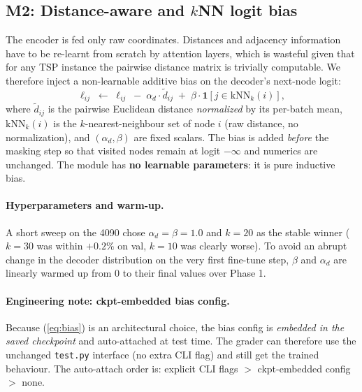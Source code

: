 \documentclass[11pt,a4paper]{article}
\begin{document}
\subsection{M2: Distance-aware and $k$NN logit bias}
\label{sec:m2}

The encoder is fed only raw coordinates. Distances and adjacency information
have to be re-learnt from scratch by attention layers, which is wasteful given
that for any TSP instance the pairwise distance matrix is trivially
computable. We therefore inject a non-learnable additive bias on the
decoder's next-node logit:
%
\begin{equation}
   \ell_{ij} \;\leftarrow\; \ell_{ij}
   \;-\; \alpha_d \cdot \tilde{d}_{ij}
   \;+\; \beta \cdot \mathbf{1}\!\left[j \in \mathrm{kNN}_k(i)\right],
   \label{eq:bias}
\end{equation}
%
where $\tilde{d}_{ij}$ is the pairwise Euclidean distance \emph{normalized}
by its per-batch mean, $\mathrm{kNN}_k(i)$ is the $k$-nearest-neighbour set
of node $i$ (raw distance, no normalization), and $(\alpha_d, \beta)$ are
fixed scalars. The bias is added \emph{before} the masking step so that
visited nodes remain at logit $-\infty$ and numerics are unchanged.
The module has \textbf{no learnable parameters}: it is pure inductive bias.

\paragraph{Hyperparameters and warm-up.} A short sweep on the 4090 chose
$\alpha_d=\beta=1.0$ and $k=20$ as the stable winner ($k=30$ was within
$+0.2\%$ on val, $k=10$ was clearly worse). To avoid an abrupt change in the
decoder distribution on the very first fine-tune step, $\beta$ and $\alpha_d$
are linearly warmed up from 0 to their final values over Phase 1.

\paragraph{Engineering note: ckpt-embedded bias config.} Because (\ref{eq:bias})
is an architectural choice, the bias config is \emph{embedded in the saved
checkpoint} and auto-attached at test time. The grader can therefore use the
unchanged \texttt{test.py} interface (no extra CLI flag) and still get the
trained behaviour. The auto-attach order is: explicit CLI flags $>$
ckpt-embedded config $>$ none.
\end{document}
